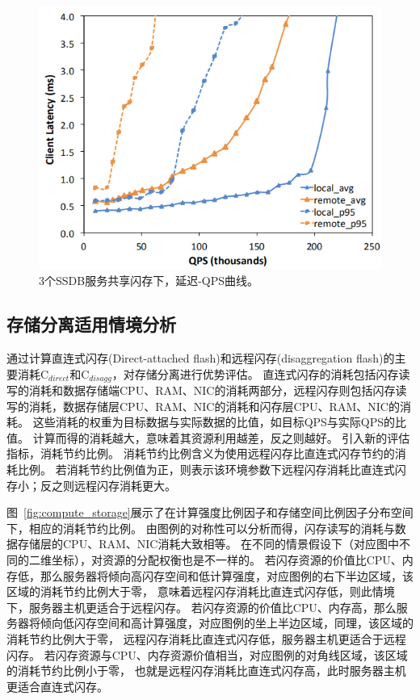 \begin{figure}
\centering
\includegraphics[scale=0.8]{Figures/storage/3SSDB_latency_QPS.jpg}
\decoRule
\caption{3个SSDB服务共享闪存下，延迟-QPS曲线。}
\label{fig:3SSDB_latency_QPS}
\end{figure}

\subsection{存储分离适用情境分析}
通过计算直连式闪存(Direct-attached flash)和远程闪存(disaggregation flash)的主要消耗C$_{direct}$和C$_{disagg}$，对存储分离进行优势评估。
直连式闪存的消耗包括闪存读写的消耗和数据存储端CPU、RAM、NIC的消耗两部分，远程闪存则包括闪存读写的消耗，数据存储层CPU、RAM、NIC的消耗和闪存层CPU、RAM、NIC的消耗。
这些消耗的权重为目标数据与实际数据的比值，如目标QPS与实际QPS的比值。
计算而得的消耗越大，意味着其资源利用越差，反之则越好。
引入新的评估指标，消耗节约比例。
消耗节约比例含义为使用远程闪存比直连式闪存节约的消耗比例。
若消耗节约比例值为正，则表示该环境参数下远程闪存消耗比直连式闪存小；反之则远程闪存消耗更大。

图~\ref{fig:compute_storage}展示了在计算强度比例因子和存储空间比例因子分布空间下，相应的消耗节约比例。
由图例的对称性可以分析而得，闪存读写的消耗与数据存储层的CPU、RAM、NIC消耗大致相等。
在不同的情景假设下（对应图中不同的二维坐标），对资源的分配权衡也是不一样的。
若闪存资源的价值比CPU、内存低，那么服务器将倾向高闪存空间和低计算强度，对应图例的右下半边区域，该区域的消耗节约比例大于零，
意味着远程闪存消耗比直连式闪存低，则此情境下，服务器主机更适合于远程闪存。
若闪存资源的价值比CPU、内存高，那么服务器将倾向低闪存空间和高计算强度，对应图例的坐上半边区域，同理，该区域的消耗节约比例大于零，
远程闪存消耗比直连式闪存低，服务器主机更适合于远程闪存。
若闪存资源与CPU、内存资源价值相当，对应图例的对角线区域，该区域的消耗节约比例小于零，
也就是远程闪存消耗比直连式闪存高，此时服务器主机更适合直连式闪存。

